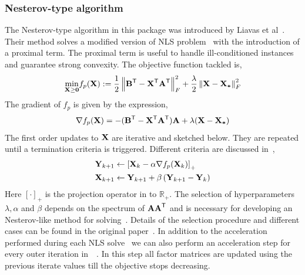 \subsubsection{Nesterov-type algorithm}
The Nesterov-type algorithm in this package was introduced by Liavas et al~\cite{LKLHS2017}. Their method solves a modified version of NLS problem~ with the introduction of a proximal term. The proximal term is useful to handle ill-conditioned instances and guarantee strong convexity. The objective function tackled is,
\begin{align}
\underset{\M{X} \ge \M{0}}{\min} f_p(\M{X}) := \frac 1 2 \left\lVert \M{B}^\Tra - \M{X}^\Tra\M{A}^\Tra \right\rVert_F^2 + \frac{\lambda}{2}\left\lVert\M{X} -\M{X_*}\right\rVert_F^2
\label{eqn:nesnls}
\end{align}
The gradient of $f_p$ is given by the expression,
\begin{align}
\nabla f_p(\M{X}) = -(\M{B}^\Tra - \M{X}^\Tra\M{A}^\Tra)\M{A} + \lambda(\M{X}-\M{X_*})
\end{align}
The first order updates to $\M{X}$ are iterative and sketched below. They are repeated until a termination criteria is triggered. Different criteria are discussed in~\cite{LKLHS2017},
\begin{align}
\begin{split}
\M{Y}_{k+1} &\leftarrow \left[ \M{X}_k - \alpha \nabla f_p(\M{X}_k)\right]_+ \\
\M{X}_{k+1} &\leftarrow \M{Y}_{k+1} + \beta \Br{\M{Y}_{k+1} - \M{Y}_k}
\end{split}
\label{eqn:nesupd}
\end{align}
Here $[\cdot]_+$ is the projection operator in to $\mathbb{R}_+$. The selection of hyperparameters $\lambda, \alpha$ and $\beta$ depends on the spectrum of $\M{A}\M{A}^\Tra$ and is necessary for developing an Nesterov-like method for solving~. Details of the selection procedure and different cases can be found in the original paper~\cite{LKLHS2017}. In addition to the acceleration performed during each NLS solve~ we can also perform an acceleration step for every outer iteration in~~. In this step all factor matrices are updated using the previous iterate values till the objective stops decreasing.

